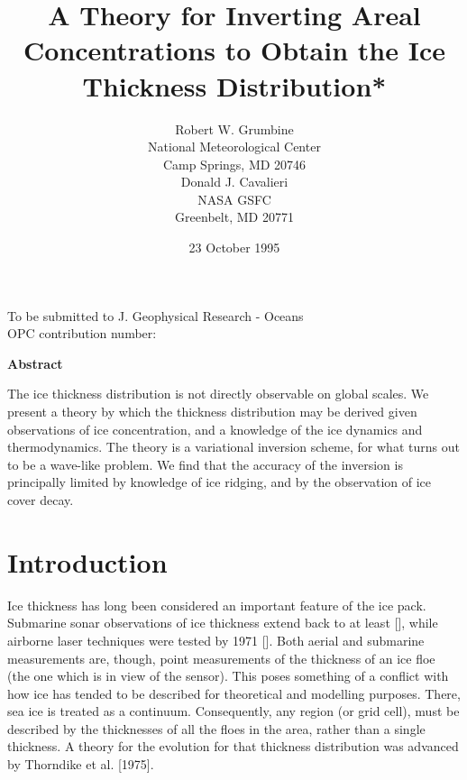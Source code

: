\textwidth=6.0in
\textheight=9.0in
\topmargin=-0.5in
\oddsidemargin=0.5in
\renewcommand{\baselinestretch}{2.0}
\newcommand{\grad}{\nabla}
\renewcommand{\div}{\grad \cdot}



\title{A Theory for Inverting Areal Concentrations to Obtain the Ice Thickness 
Distribution*}
\author{ Robert W. Grumbine \\
National Meteorological Center\\
Camp Springs, MD 20746\\
Donald J. Cavalieri\\
NASA GSFC\\
Greenbelt, MD 20771}
\date {23 October 1995}
\maketitle
\begin{center}
To be submitted to J. Geophysical Research - Oceans  \\
OPC contribution number:
\end{center}

\pagebreak

{\bf Abstract}
    
    The ice thickness distribution is not directly observable on global 
scales.  We present a theory by which the thickness distribution may be
derived given observations of ice concentration, and a knowledge of the
ice dynamics and thermodynamics.  The theory is a variational inversion
scheme, for what turns out to be a wave-like problem.  We find that the
accuracy of the inversion is principally limited by knowledge of ice ridging,
and by the observation of ice cover decay.


\section{Introduction}

    Ice thickness has long been considered an
important feature of the ice pack.  Submarine sonar observations of ice 
thickness extend back to at least [], while airborne laser techniques were 
tested by 1971 [].  Both aerial and submarine measurements are, though,
point measurements of the thickness of an ice floe (the one which is 
in view of the sensor).  This poses something of a conflict with how ice
has tended to be described for theoretical and modelling purposes.  There,
sea ice is treated as a continuum.  Consequently, any region (or grid cell),
must be described by the thicknesses of all the floes in the area, rather
than a single thickness.  A theory for the evolution for that thickness 
distribution was advanced by Thorndike et al. [1975].

